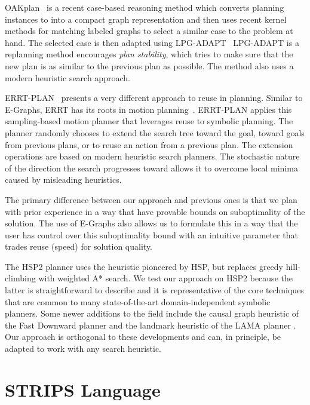 \documentclass[letterpaper]{article}
\begin{document}
OAKplan~\cite{Serina:2010:KFC:1860143.1860472} is a recent 
case-based reasoning method which converts 
planning instances to into a compact graph representation and 
then uses recent kernel methods for matching labeled graphs to select
a similar case to the problem at hand. The selected case is then 
adapted using LPG-ADAPT~\cite{Fox06planstability} LPG-ADAPT is a replanning method 
encourages \textit{plan stability}, which tries to make 
sure that the new plan is as similar to the previous plan as possible. 
The method also uses a modern heuristic search approach.

ERRT-PLAN~\cite{workshop-icaps12-errtplan} presents a very different 
approach to reuse in planning. 
Similar to E-Graphs, ERRT has its roots in motion planning~\cite{Bruce:2002}.
ERRT-PLAN applies this sampling-based motion planner that leverages 
reuse to symbolic planning. The planner randomly chooses to extend 
the search tree toward the goal, toward goals from previous 
plans, or to reuse an action from a previous plan. 
The extension operations are based on modern heuristic search
planners.
The stochastic nature of the direction the search progresses toward
allows it to overcome local minima caused by misleading heuristics.

The primary difference between our approach and previous ones 
is that we plan with prior experience in a way that have provable
bounds on suboptimality of the solution. The use of E-Graphs also
allows us to formulate this in a way that the user has control over
this suboptimality bound with an intuitive parameter that trades
reuse (speed) for solution quality.

The HSP2 \cite{bonet2001planning} planner uses the heuristic pioneered by HSP, but replaces greedy hill-climbing with weighted A* search.
We test our approach on HSP2 because the latter is straightforward to describe and it is representative of the core techniques that are common to many state-of-the-art domain-independent symbolic planners.
Some newer additions to the field include the causal graph heuristic of the Fast Downward planner \cite{helmert2006fast} and the landmark heuristic of the LAMA planner \cite{richter2010lama}. Our approach is orthogonal to these developments and can, in principle, be adapted to work with any search heuristic.

\section{STRIPS Language}
\end{document}
